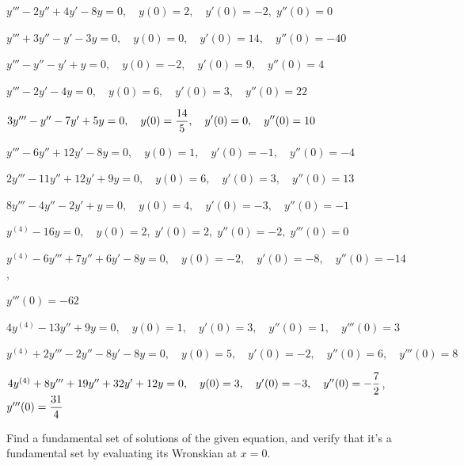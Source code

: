 \begin{exerciselist}
  \item\label{exer:9.2.15} $y'''-2y''+4y'-8y=0,\quad y(0)=2,\quad y'(0)=-2,\;y''(0)=0$

  \item\label{exer:9.2.16} $y'''+3y''-y'-3y=0,\quad y(0)=0,\quad y'(0)=14,\quad y''(0)=-40$

  \item\label{exer:9.2.17} \CGex $y'''-y''-y'+y=0,\quad y(0)=-2,\quad y'(0)=9,\quad y''(0)=4$

  \item\label{exer:9.2.18} \CGex $y'''-2y'-4y=0,\quad y(0)=6,\quad y'(0)=3,\quad y''(0)=22$

  \item\label{exer:9.2.19} \CGex

  $3y'''-y''-7y'+5y=0,\quad y(0)=\displaystyle\frac{14}{5},\quad y'(0)=0,\quad y''(0)=10$

  \item\label{exer:9.2.20} $y'''-6y''+12y'-8y=0,\quad y(0)=1,\quad y'(0)=-1,\quad y''(0)=-4$

  \item\label{exer:9.2.21} $2y'''-11y''+12y'+9y=0,\quad y(0)=6,\quad y'(0)=3,\quad y''(0)=13$

  \item\label{exer:9.2.22} $8y'''-4y''-2y'+y=0,\quad y(0)=4,\quad y'(0)=-3,\quad y''(0)=-1$

  \item\label{exer:9.2.23} $y^{(4)}-16y=0,\quad y(0)=2,\;y'(0)=2,\;y''(0)=-2,\;y'''(0)=0$

  \item\label{exer:9.2.24}
        $y^{(4)}-6y'''+7y''+6y'-8y=0,\quad y(0)=-2,\quad y'(0)=-8,\quad y''(0)=-14$,

  $y'''(0)=-62$

  \item\label{exer:9.2.25}
        $4y^{(4)}-13y''+9y=0,\quad y(0)=1,\quad y'(0)=3,\quad y''(0)=1,\quad y'''(0)=3$

  \item\label{exer:9.2.26}
        $y^{(4)}+2y'''-2y''-8y'-8y=0,\quad y(0)=5,\quad y'(0)=-2,\quad y''(0)=6,\quad y'''(0)=8$

  \item\label{exer:9.2.27} \CGex
        $4y^{(4)}+8y'''+19y''+32y'+12y=0,\quad y(0)=3,\quad y'(0)=-3,\quad y''(0)= -\displaystyle\frac{7}{2}$,
        $y'''(0)=\displaystyle\frac{31}{4}$

  \item\label{exer:9.2.28} Find a fundamental set of solutions of the given equation, and verify
        that it's a fundamental set by evaluating its Wronskian at $x=0$.


\end{exerciselist}
